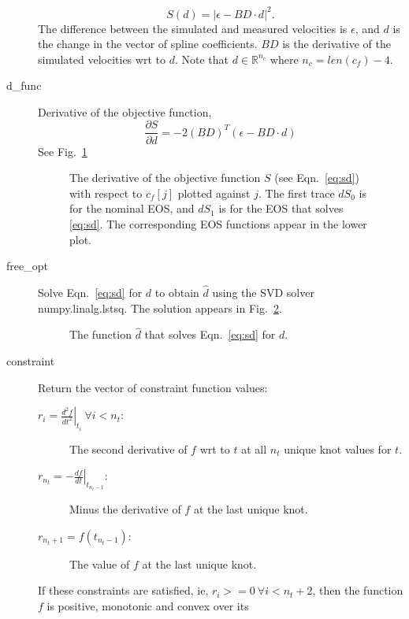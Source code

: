 \documentclass[11pt]{article}
\newcommand{\field}[1]{\mathbb{#1}}
\newcommand\REAL{\field{R}}
\newcommand{\partiald}[2]{\frac{\partial #1}{\partial #2}}
\begin{document}
\begin{description}
  \begin{equation*}
    S(d) = \left| \epsilon - BD\cdot d \right|^2.
  \end{equation*}
  The difference between the simulated and measured velocities is
  $\epsilon$, and $d$ is the change in the vector of spline
  coefficients.  $BD$ is the derivative of the simulated velocities
  wrt to $d$.  Note that $d\in \REAL^{n_c}$ where $n_c = len(c_f)-4$.
\item[d\_func] Derivative of the objective function,
  \begin{equation*}
    \partiald{S}{d} = -2(BD)^T(\epsilon - BD\cdot d)
  \end{equation*}
  See Fig.~\ref{fig:d_func_test}
  \begin{figure}
    \centering
    \caption{The derivative of the objective function $S$ (see
      Eqn.~\eqref{eq:sd}) with respect to $c_f[j]$ plotted against $j$.
      The first trace $dS_0$ is for the nominal EOS, and $dS_1$ is for
    the EOS that solves \eqref{eq:sd}.  The corresponding EOS
    functions appear in the lower plot.}
    \label{fig:d_func_test}
  \end{figure}
\item[free\_opt] Solve Eqn.~\eqref{eq:sd} for $d$ to obtain $\hat d$
  using the SVD solver numpy.linalg.lstsq.  The solution appears in
  Fig.~\ref{fig:d_hat_test}.
  \begin{figure}
    \centering
    \caption{The function $\hat d$ that solves Eqn.~\eqref{eq:sd} for $d$.}
    \label{fig:d_hat_test}
  \end{figure}
\item[constraint] Return the vector of constraint function values:
  \begin{description}
  \item[$r_{i} = \left. \frac{d^2 f}{d t^2} \right|_{t_i}~\forall i
    < n_t$:]
    The second derivative of $f$ wrt to $t$ at all $n_t$ unique knot
    values for $t$.
  \item[$r_{n_t} = - \left. \frac{d f}{d t} \right|_{t_{n_{t}-1}}$:]
    Minus the derivative of $f$ at the last unique knot.
  \item[$r_{n_t+1} = f(t_{n_{t}-1})$:] The value of $f$ at the last
    unique knot.
  \end{description}
  If these constraints are satisfied, ie, $r_i>=0~\forall i<n_t+2$,
  then the function $f$ is positive, monotonic and convex over its

\end{description}
\end{document}
